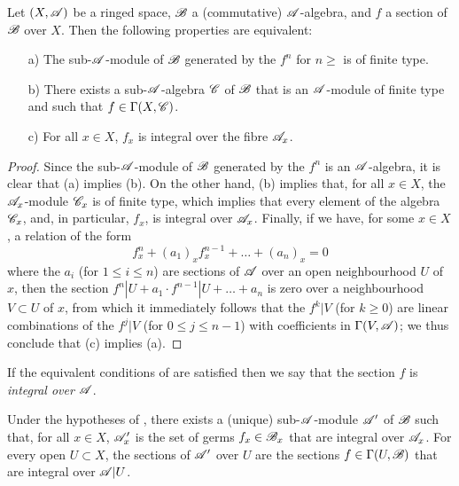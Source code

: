 \begin{proposition}[6.3.1]
\label{II.6.3.1}
Let $(X,\mathscr{A})$ be a ringed space, $\mathscr{B}$ a (commutative) $\mathscr{A}$-algebra, and $f$ a section of $\mathscr{B}$ over $X$.
Then the following properties are equivalent:
\begin{enumerate}
  \item[a)] The sub-$\mathscr{A}$-module of $\mathscr{B}$ generated by the $f^n$ for $n\geq$  is of finite type.
  \item[b)] There exists a sub-$\mathscr{A}$-algebra $\mathscr{C}$ of $\mathscr{B}$ that is an $\mathscr{A}$-module of finite type and such that $f\in\Gamma(X,\mathscr{C})$.
  \item[c)] For all $x\in X$, $f_x$ is integral over the fibre $\mathscr{A}_x$.
\end{enumerate}
\end{proposition}

\begin{proof}
Since the sub-$\mathscr{A}$-module of $\mathscr{B}$ generated by the $f^n$ is an $\mathscr{A}$-algebra, it is clear that (a) implies (b).
On the other hand, (b) implies that, for all $x\in X$, the $\mathscr{A}_x$-module $\mathscr{C}_x$ is of finite type, which implies that every element of the algebra $\mathscr{C}_x$, and, in particular, $f_x$, is integral over $\mathscr{A}_x$.
Finally, if we have, for some $x\in X$, a relation of the form
\[
  f_x^n + (a_1)_xf_x^{n-1} + \ldots + (a_n)_x = 0
\]
where the $a_i$ (for $1\leq i\leq n$) are sections of $\mathscr{A}$ over an open neighbourhood $U$ of $x$, then the section $f^n|U+a_1\cdot f^{n-1}|U+\ldots+a_n$ is zero over a neighbourhood $V\subset U$ of $x$, from which it immediately follows that the $f^k|V$ (for $k\geq0$) are linear combinations of the $f^j|V$ (for $0\leq j\leq n-1$) with coefficients in $\Gamma(V,\mathscr{A})$;
we thus conclude that (c) implies (a).
\end{proof}

If the equivalent conditions of  are satisfied then we say that the section $f$ is \emph{integral over $\mathscr{A}$}.

\begin{corollary}[6.3.2]
\label{II.6.3.2}
Under the hypotheses of , there exists a (unique) sub-$\mathscr{A}$-module $\mathscr{A}'$ of $\mathscr{B}$ such that, for all $x\in X$, $\mathscr{A}'_x$ is the set of germs $f_x\in\mathscr{B}_x$ that are integral over $\mathscr{A}_x$.
For every open $U\subset X$, the sections of $\mathscr{A}'$ over $U$ are the sections $f\in\Gamma(U,\mathscr{B})$ that are integral over $\mathscr{A}|U$.
\end{corollary}

